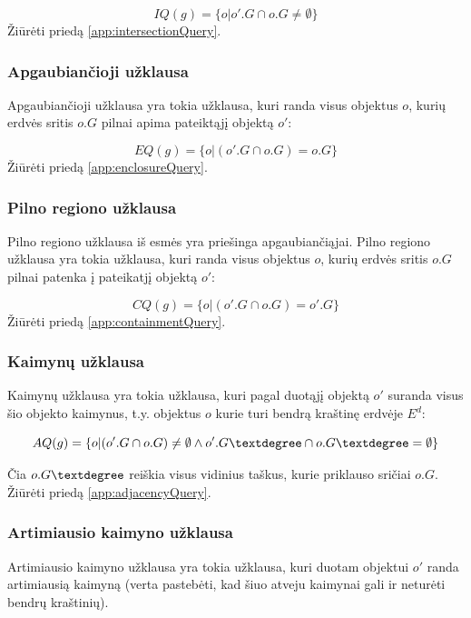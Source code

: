 \begin{equation}
	IQ(g) = \{ o | o'.G \cap o.G \neq \emptyset \}
\label{eq:ExactMatchQuery}
\end{equation}
Žiūrėti priedą \ref{app:intersectionQuery}.

\subsubsection{Apgaubiančioji užklausa}
Apgaubiančioji užklausa yra tokia užklausa, kuri randa visus objektus $o$, kurių erdvės sritis $o.G$ pilnai apima pateiktąjį objektą $o'$:

\begin{equation}
	EQ(g) = \{ o | (o'.G \cap o.G) = o.G \}
\label{eq:ExactMatchQuery}
\end{equation}
Žiūrėti priedą \ref{app:enclosureQuery}.


\subsubsection{Pilno regiono užklausa}
Pilno regiono užklausa iš esmės yra priešinga apgaubiančiąjai.
Pilno regiono užklausa yra tokia užklausa, kuri randa visus objektus $o$, kurių erdvės sritis $o.G$ pilnai patenka į pateikatjį objektą $o'$:

\begin{equation}
	CQ(g) = \{ o | (o'.G \cap o.G) = o'.G \}
\label{eq:ExactMatchQuery}
\end{equation}
Žiūrėti priedą \ref{app:containmentQuery}.


\subsubsection{Kaimynų užklausa}
Kaimynų užklausa yra tokia užklausa, kuri pagal duotąjį objektą $o'$ suranda visus šio objekto kaimynus, t.y. objektus $o$ kurie turi bendrą kraštinę erdvėje $E^d$:

\begin{equation}
	AQ(g) = \{ o | (o'.G \cap o.G) \neq \emptyset \land o'.G\textdegree \cap o.G\textdegree = \emptyset \}
\label{eq:ExactMatchQuery}
\end{equation}

Čia $o.G\textdegree$ reiškia visus vidinius taškus, kurie priklauso sričiai $o.G$.
Žiūrėti priedą \ref{app:adjacencyQuery}.


\subsubsection{Artimiausio kaimyno užklausa}
Artimiausio kaimyno užklausa yra tokia užklausa, kuri duotam objektui $o'$ randa artimiausią kaimyną (verta pastebėti, kad šiuo atveju kaimynai gali ir neturėti bendrų kraštinių).

